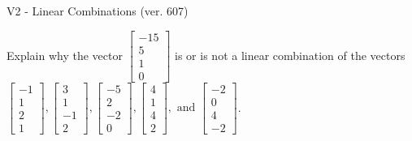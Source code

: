 \begin{exercise}
  \begin{exerciseTitle}V2 - Linear Combinations (ver. 607)\end{exerciseTitle}
  \begin{exerciseStatement}
    Explain why the vector \(\left[\begin{array}{c}
-15 \\
5 \\
1 \\
0
\end{array}\right]\)  is or is not a linear 
	combination of the vectors \(\left[\begin{array}{c}
-1 \\
1 \\
2 \\
1
\end{array}\right] , \left[\begin{array}{c}
3 \\
1 \\
-1 \\
2
\end{array}\right] , \left[\begin{array}{c}
-5 \\
2 \\
-2 \\
0
\end{array}\right] , \left[\begin{array}{c}
4 \\
1 \\
4 \\
2
\end{array}\right] , \text{ and } \left[\begin{array}{c}
-2 \\
0 \\
4 \\
-2
\end{array}\right]\).
	



\end{exerciseStatement}
\end{exercise}
